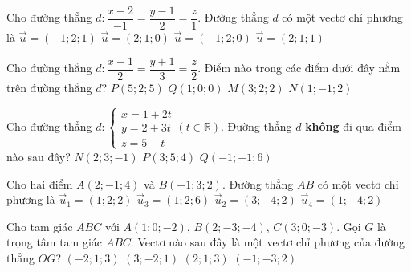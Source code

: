 \begin{ex}
	Cho đường thẳng $d\colon \dfrac{x-2}{-1}=\dfrac{y-1}{2}=\dfrac{z}{1}$. Đường thẳng $d$ có một vectơ chỉ phương là
	\choice
	{\True $\vec{u}=(-1;2;1)$}
	{ $\vec{u}=(2;1;0)$}
	{ $\vec{u}=(-1;2;0)$}
	{ $\vec{u}=(2;1;1)$}
\end{ex}

\begin{ex}
	Cho đường thẳng $d: \dfrac{x-1}{2}=\dfrac{y+1}{3}=\dfrac{z}{2}$. Điểm nào trong các điểm dưới đây nằm trên đường thẳng $d$?
	\choice
	{$P(5;2;5)$}
	{$Q(1;0;0)$}
	{\True $M(3;2;2)$}
	{$N(1;-1;2)$}
	\loigiai{
	}
\end{ex}

\begin{ex}
	Cho đường thẳng $d: \begin{cases}
		x=1+2t \\
		y=2+3t \\
		z=5-t
	\end{cases}(t\in \mathbb{R})$. Đường thẳng $d$ \textbf{không} đi qua điểm nào sau đây?
	{\True $N(2;3;-1)$}
	{$P(3;5;4)$}
	{$Q(-1;-1;6)$} 
	\loigiai{
	}
\end{ex}

\begin{ex}%
	Cho hai điểm $A(2;-1;4)$ và $B(-1;3;2)$. Đường thẳng $AB$ có một vectơ chỉ phương là
	\choice
	{$\overrightarrow{u}_1=(1;2;2)$}
	{$\overrightarrow{u}_3=(1;2;6)$}
	{\True $\overrightarrow{u}_2=(3;-4;2)$}
	{$\overrightarrow{u}_4=(1;-4;2)$}
\end{ex}

\begin{ex}%
	Cho tam giác $ABC$ với $A(1;0;-2)$, $B(2;-3;-4)$, $C(3;0;-3)$. Gọi $G$ là trọng tâm tam giác $ABC$. Vectơ nào sau đây là một vectơ chỉ phương của đường thẳng $OG$?
	\choice
	{\True $(-2;1;3)$}
	{$(3;-2;1)$}
	{$(2;1;3)$}
	{$(-1;-3;2)$}
\end{ex}

